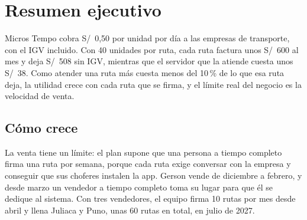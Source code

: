\documentclass[10.5pt,a4paper]{article}
\begin{document}
\section{Resumen ejecutivo}

Micros Tempo cobra S/~0,50 por unidad por día a las empresas de transporte, con el IGV incluido. Con 40 unidades por ruta, cada ruta factura unos S/~600 al mes y deja S/~508 sin IGV, mientras que el servidor que la atiende cuesta unos S/~38. Como atender una ruta más cuesta menos del 10\,\% de lo que esa ruta deja, la utilidad crece con cada ruta que se firma, y el límite real del negocio es la velocidad de venta.

\noindent
\begin{minipage}[t]{0.32\linewidth}\end{minipage}\hfill
\begin{minipage}[t]{0.32\linewidth}\end{minipage}\hfill
\begin{minipage}[t]{0.32\linewidth}\end{minipage}

\vspace{4pt}\noindent
\begin{minipage}[t]{0.32\linewidth}\end{minipage}\hfill
\begin{minipage}[t]{0.32\linewidth}\end{minipage}\hfill
\begin{minipage}[t]{0.32\linewidth}\end{minipage}

\subsection{Cómo crece}

La venta tiene un límite: el plan supone que una persona a tiempo completo firma una ruta por semana, porque cada ruta exige conversar con la empresa y conseguir que sus choferes instalen la app. Gerson vende de diciembre a febrero, y desde marzo un vendedor a tiempo completo toma su lugar para que él se dedique al sistema. Con tres vendedores, el equipo firma 10 rutas por mes desde abril y llena Juliaca y Puno, unas 60 rutas en total, en julio de 2027.
\end{document}
